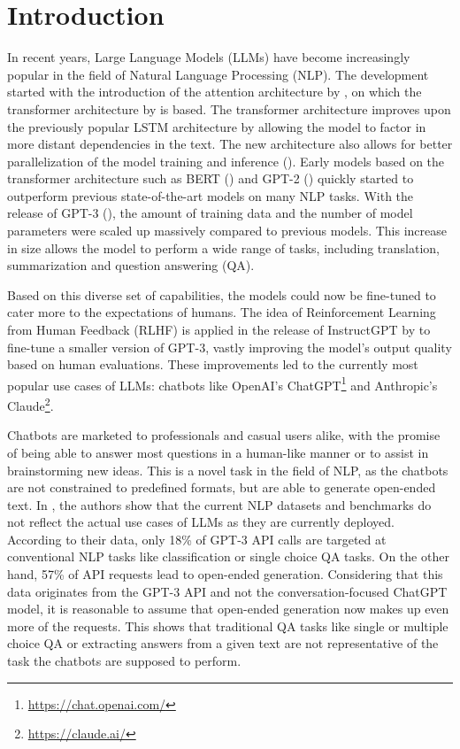 \chapter{Introduction}\label{structure}
In recent years, Large Language Models (LLMs) have become increasingly popular in the field of Natural Language Processing (NLP).
The development started with the introduction of the attention architecture by \cite{bahdanau:2014:neural}, on which the transformer architecture by \cite{vaswani:2017:Attention} is based.
The transformer architecture improves upon the previously popular LSTM architecture by allowing the model to factor in more distant dependencies in the text.
The new architecture also allows for better parallelization of the model training and inference (\cite{vaswani:2017:Attention}).
Early models based on the transformer architecture such as BERT (\cite{devlin:2018:BERT}) and GPT-2 (\cite{radford:2018:Improving}) quickly started to outperform previous state-of-the-art models on many NLP tasks.
With the release of GPT-3 (\cite{brown:2020:Language}), the amount of training data and the number of model parameters were scaled up massively compared to previous models.
This increase in size allows the model to perform a wide range of tasks, including translation, summarization and question answering (QA).

Based on this diverse set of capabilities, the models could now be fine-tuned to cater more to the expectations of humans. 
The idea of Reinforcement Learning from Human Feedback (RLHF) is applied in the release of InstructGPT by \cite{ouyang:2022:Training} to fine-tune a smaller version of GPT-3, vastly improving the model's output quality based on human evaluations.
These improvements led to the currently most popular use cases of LLMs: chatbots like OpenAI's ChatGPT\footnote{\url{https://chat.openai.com/}} and Anthropic's Claude\footnote{\url{https://claude.ai/}}.

Chatbots are marketed to professionals and casual users alike, with the promise of being able to answer most questions in a human-like manner or to assist in brainstorming new ideas.
This is a novel task in the field of NLP, as the chatbots are not constrained to predefined formats, but are able to generate open-ended text.
In \cite{ouyang:2022:Training}, the authors show that the current NLP datasets and benchmarks do not reflect the actual use cases of LLMs as they are currently deployed.
According to their data, only 18\% of GPT-3 API calls are targeted at conventional NLP tasks like classification or single choice QA tasks.
On the other hand, 57\% of API requests lead to open-ended generation.
Considering that this data originates from the GPT-3 API and not the conversation-focused ChatGPT model, it is reasonable to assume that open-ended generation now makes up even more of the requests.
This shows that traditional QA tasks like single or multiple choice QA or extracting answers from a given text are not representative of the task the chatbots are supposed to perform.

